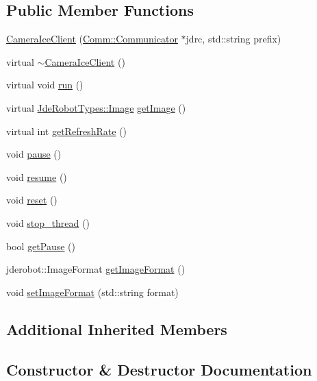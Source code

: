 \subsection*{Public Member Functions}
\begin{DoxyCompactItemize}
\item 
\hyperlink{class_comm_1_1_camera_ice_client_aa59fe901fa8a7c4b0cb2404a0922905e}{Camera\+Ice\+Client} (\hyperlink{class_comm_1_1_communicator}{Comm\+::\+Communicator} $\ast$jdrc, std\+::string prefix)
\item 
virtual \hyperlink{class_comm_1_1_camera_ice_client_a2c506c1c710f2f9daae1a62bd743ffbc}{$\sim$\+Camera\+Ice\+Client} ()
\item 
virtual void \hyperlink{class_comm_1_1_camera_ice_client_a74d06122ed0688df849d2de07bbd0a03}{run} ()
\item 
virtual \hyperlink{class_jde_robot_types_1_1_image}{Jde\+Robot\+Types\+::\+Image} \hyperlink{class_comm_1_1_camera_ice_client_aff1f3ff0d95d8a04aacfe5cfc9955740}{get\+Image} ()
\item 
virtual int \hyperlink{class_comm_1_1_camera_ice_client_a4c6bcb1559bd04fe1b55461352056430}{get\+Refresh\+Rate} ()
\item 
void \hyperlink{class_comm_1_1_camera_ice_client_a7ebc60a1d24250d7e5576cc31379d713}{pause} ()
\item 
void \hyperlink{class_comm_1_1_camera_ice_client_aff6fbedebcb3952d1bd30b817566dede}{resume} ()
\item 
void \hyperlink{class_comm_1_1_camera_ice_client_af8e062a6dc719ea32e77a8ce86ef9880}{reset} ()
\item 
void \hyperlink{class_comm_1_1_camera_ice_client_afde034cca2e5396b5c439069dfab4725}{stop\+\_\+thread} ()
\item 
bool \hyperlink{class_comm_1_1_camera_ice_client_abedbd7e2e8c3cd30a98e021ed32b669b}{get\+Pause} ()
\item 
jderobot\+::\+Image\+Format \hyperlink{class_comm_1_1_camera_ice_client_a9bae237053652d87942735619c15108a}{get\+Image\+Format} ()
\item 
void \hyperlink{class_comm_1_1_camera_ice_client_a1d6d27613011cd14091c8162459b2388}{set\+Image\+Format} (std\+::string format)
\end{DoxyCompactItemize}
\subsection*{Additional Inherited Members}


\subsection{Constructor \& Destructor Documentation}
\mbox{\label{class_comm_1_1_camera_ice_client_aa59fe901fa8a7c4b0cb2404a0922905e}} 
